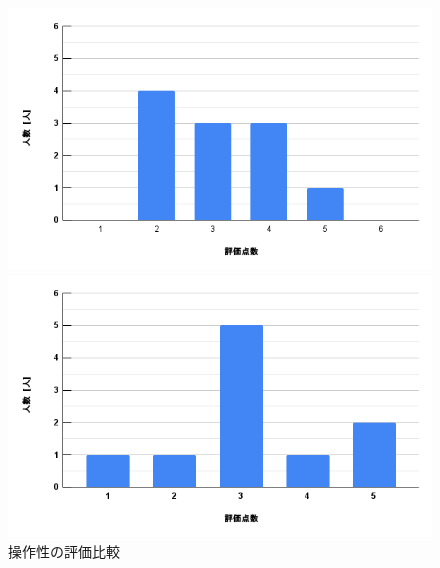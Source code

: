 \documentclass{ltjsreport}
\begin{document}
		\begin{figure}[H]
		\centering
		\begin{minipage}{0.45\columnwidth}
		\centering
		\includegraphics[width = \columnwidth]{../figs/PC-2.png}
		\end{minipage}
		\hspace{0.04\columnwidth}
		\begin{minipage}{0.45\columnwidth}
		\centering
		\includegraphics[width = \columnwidth]{../figs/iOS-2.png}
		\end{minipage}
		\caption{操作性の評価比較}
		\end{figure}
\end{document}
